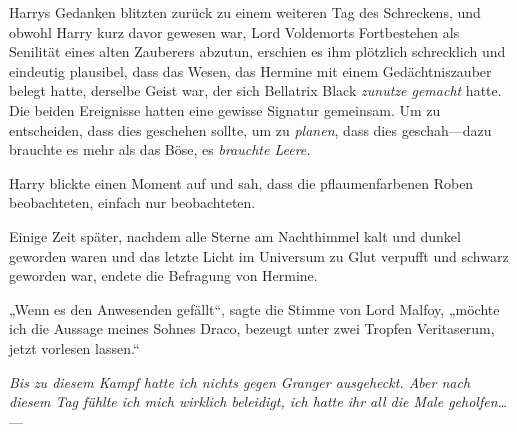 Harrys Gedanken blitzten zurück zu einem weiteren Tag des Schreckens, und obwohl Harry kurz davor gewesen war, Lord Voldemorts Fortbestehen als Senilität eines alten Zauberers abzutun, erschien es ihm plötzlich schrecklich und eindeutig plausibel, dass das Wesen, das Hermine mit einem Gedächtniszauber belegt hatte, derselbe Geist war, der sich Bellatrix Black \emph{zunutze gemacht} hatte. Die beiden Ereignisse hatten eine gewisse Signatur gemeinsam. Um zu entscheiden, dass dies geschehen sollte, um zu \emph{planen}, dass dies geschah—dazu brauchte es mehr als das Böse, es \emph{brauchte Leere.}

Harry blickte einen Moment auf und sah, dass die pflaumenfarbenen Roben beobachteten, einfach nur beobachteten.

Einige Zeit später, nachdem alle Sterne am Nachthimmel kalt und dunkel geworden waren und das letzte Licht im Universum zu Glut verpufft und schwarz geworden war, endete die Befragung von Hermine.

„Wenn es den Anwesenden gefällt“, sagte die Stimme von Lord Malfoy, „möchte ich die Aussage meines Sohnes Draco, bezeugt unter zwei Tropfen Veritaserum, jetzt vorlesen lassen.“

\emph{Bis zu diesem Kampf hatte ich nichts gegen Granger ausgeheckt. Aber nach diesem Tag fühlte ich mich wirklich beleidigt, ich hatte ihr all die Male geholfen…}—

